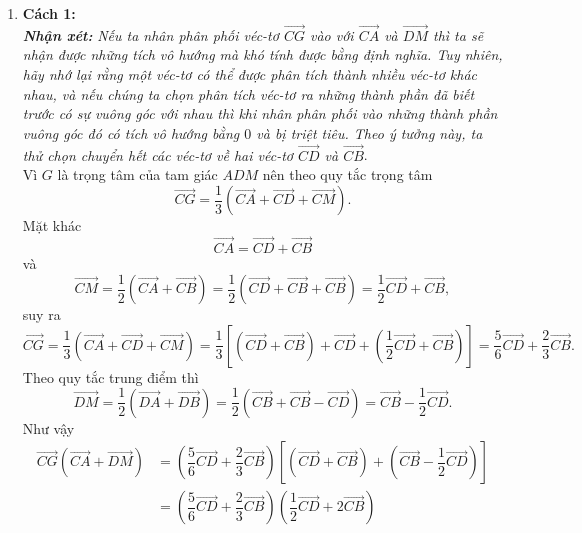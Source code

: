 \begin{vd}
{\begin{enumerate}
			Vậy $ \left (\overrightarrow{AB}+\overrightarrow{AD}\right )\left (\overrightarrow{BD}+\overrightarrow{BC}\right )=a\cdot (-a)+(-a)\cdot(-2a)=a^2 $.
			\item \textbf{Cách 1:}\\
			\textit{\textbf{Nhận xét:}} \textit{Nếu ta nhân phân phối véc-tơ $ \overrightarrow{CG} $ vào với $ \overrightarrow{CA} $ và $ \overrightarrow{DM} $ thì ta sẽ nhận được những tích vô hướng mà khó tính được bằng định nghĩa. Tuy nhiên, hãy nhớ lại rằng một véc-tơ có thể được phân tích thành nhiều véc-tơ khác nhau, và nếu chúng ta chọn phân tích véc-tơ ra những thành phần đã biết trước có sự vuông góc với nhau thì khi nhân phân phối vào những thành phần vuông góc đó có tích vô hướng bằng $ 0 $ và bị triệt tiêu. Theo ý tưởng này, ta thử chọn chuyển hết các véc-tơ về hai véc-tơ $ \overrightarrow{CD} $ và $ \overrightarrow{CB} $}.\\
			Vì $ G $ là trọng tâm của tam giác $ ADM $ nên theo quy tắc trọng tâm $$ \overrightarrow{CG}=\dfrac{1}{3}\left (\overrightarrow{CA}+\overrightarrow{CD}+\overrightarrow{CM}\right ).$$
			Mặt khác $$ \overrightarrow{CA}=\overrightarrow{CD}+\overrightarrow{CB} $$ và $$ \overrightarrow{CM}=\dfrac{1}{2}\left( \overrightarrow{CA}+\overrightarrow{CB} \right)=\dfrac{1}{2}\left( \overrightarrow{CD}+\overrightarrow{CB}+\overrightarrow{CB} \right)=\dfrac{1}{2}\overrightarrow{CD}+\overrightarrow{CB} ,$$
			suy ra $$ \overrightarrow{CG}=\dfrac{1}{3}\left (\overrightarrow{CA}+\overrightarrow{CD}+\overrightarrow{CM}\right )=\dfrac{1}{3}\left [\left( \overrightarrow{CD}+\overrightarrow{CB}\right) +\overrightarrow{CD}+\left( \dfrac{1}{2}\overrightarrow{CD}+\overrightarrow{CB}\right)\right ] =\dfrac{5}{6}\overrightarrow{CD}+\dfrac{2}{3}\overrightarrow{CB} .$$
			Theo quy tắc trung điểm thì $$ \overrightarrow{DM}=\dfrac{1}{2}\left( \overrightarrow{DA}+\overrightarrow{DB} \right)=\dfrac{1}{2}\left( \overrightarrow{CB}+\overrightarrow{CB}-\overrightarrow{CD} \right)=\overrightarrow{CB}-\dfrac{1}{2}\overrightarrow{CD} .$$
			Như vậy
			\begin{align*}
				\overrightarrow{CG}\left (\overrightarrow{CA}+\overrightarrow{DM}\right )&=\left( \dfrac{5}{6}\overrightarrow{CD}+\dfrac{2}{3}\overrightarrow{CB} \right)\left [\left( \overrightarrow{CD}+\overrightarrow{CB} \right)+\left( \overrightarrow{CB}-\dfrac{1}{2}\overrightarrow{CD}  \right)  \right ]\\
				&=\left( \dfrac{5}{6}\overrightarrow{CD}+\dfrac{2}{3}\overrightarrow{CB} \right)\left( \dfrac{1}{2}\overrightarrow{CD}+2\overrightarrow{CB} \right)\\

\end{align*}
\end{enumerate}}
\end{vd}

